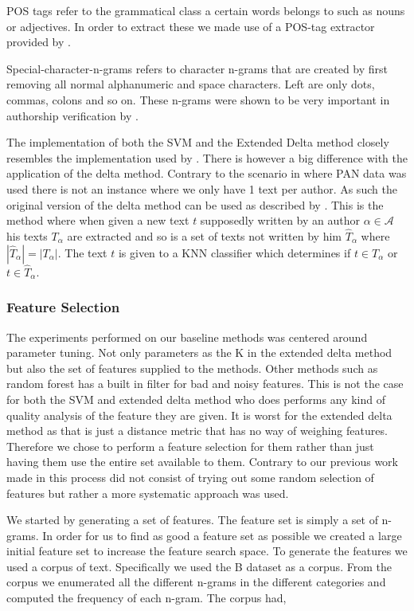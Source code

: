 \gls{POS} tags refer to the grammatical class a certain words belongs to such
as nouns or adjectives. In order to extract these we made use of a POS-tag
extractor provided by \citet{polyglot}.

Special-character-n-grams refers to character n-grams that are created by first
removing all normal alphanumeric and space characters. Left are only dots,
commas, colons and so on. These n-grams were shown to be very important in
authorship verification by \citep{US}.

The implementation of both the \gls{SVM} and the Extended Delta method closely
resembles the implementation used by \citet{US}. There is however a big
difference with the application of the delta method. Contrary to the scenario
in \citet{US} where PAN data was used there is not an instance where we only
have 1 text per author. As such the original version of the delta method can be
used as described by \citet{evert2015towards}. This is the method where when
given a new text $t$ supposedly written by an author $\alpha \in \mathcal{A}$
his texts $T_\alpha$ are extracted and so is a set of texts not written by
him $\hat{T}_\alpha$ where $|\hat{T}_\alpha| = |T_\alpha|$. The text $t$ is
given to a \gls{KNN} classifier which determines if $t \in T_\alpha$ or $t \in
\hat{T}_\alpha$.


\subsubsection{Feature Selection}

The experiments performed on our baseline methods was centered around parameter
tuning. Not only parameters as the K in the extended delta method but also the
set of features supplied to the methods. Other methods such as random forest
has a built in filter for bad and noisy features. This is not the case for both
the \gls{SVM} and extended delta method who does performs any kind of quality
analysis of the feature they are given. It is worst for the extended delta
method as that is just a distance metric that has no way of weighing features.
Therefore we chose to perform a feature selection for them rather than just
having them use the entire set available to them. Contrary to our previous
work made in \citep{US} this process did not consist of trying out some random
selection of features but rather a more systematic approach was used.

We started by generating a set of features. The feature set is simply a set of
n-grams. In order for us to find as good a feature set as possible we created a
large initial feature set to increase the feature search space. To generate the
features we used a corpus of text. Specifically we used the \gls{B} dataset as a
corpus. From the corpus we enumerated all the different n-grams in the different
categories and computed the frequency of each n-gram. The corpus had,

